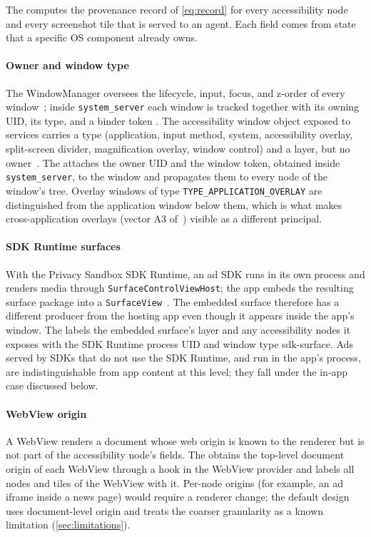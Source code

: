 The \LS{} computes the provenance record of \cref{eq:record} for every accessibility node and every screenshot tile that is served to an agent. Each field comes from state that a specific OS component already owns.

\paragraph{Owner and window type} The WindowManager oversees the lifecycle, input, focus, and z-order of every window~\cite{android_surfaceflinger}; inside \texttt{system\_server} each window is tracked together with its owning UID, its type, and a binder token . The accessibility window object exposed to services carries a type (application, input method, system, accessibility overlay, split-screen divider, magnification overlay, window control) and a layer, but no owner~\cite{android_accessibilitywindowinfo}. The \LS{} attaches the owner UID and the window token, obtained inside \texttt{system\_server}, to the window and propagates them to every node of the window's tree. Overlay windows of type \texttt{TYPE\_APPLICATION\_OVERLAY} are distinguished from the application window below them, which is what makes cross-application overlays (vector A3 of~\cite{deivasigamani2026nota11y}) visible as a different principal.

\paragraph{SDK Runtime surfaces} With the Privacy Sandbox SDK Runtime, an ad SDK runs in its own process and renders media through \texttt{SurfaceControlViewHost}; the app embeds the resulting surface package into a \texttt{SurfaceView}~\cite{android_sdkruntime}. The embedded surface therefore has a different producer from the hosting app even though it appears inside the app's window. The \LS{} labels the embedded surface's layer and any accessibility nodes it exposes with the SDK Runtime process UID and window type \textsf{sdk-surface}. Ads served by SDKs that do not use the SDK Runtime, and run in the app's process, are indistinguishable from app content at this level; they fall under the in-app case discussed below.

\paragraph{WebView origin} A WebView renders a document whose web origin is known to the renderer but is not part of the accessibility node's fields. The \LS{} obtains the top-level document origin of each WebView through a hook in the WebView provider and labels all nodes and tiles of the WebView with it. Per-node origins (for example, an ad iframe inside a news page) would require a renderer change; the default design uses document-level origin and treats the coarser granularity as a known limitation (\cref{sec:limitations}).

